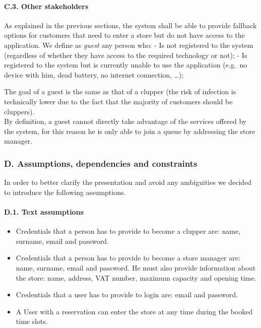 \documentclass[
]{article}
\providecommand{\tightlist}{%
  \setlength{\itemsep}{0pt}\setlength{\parskip}{0pt}}
\begin{document}
\hypertarget{c.3.-other-stakeholders}{%
\paragraph{C.3. Other stakeholders}\label{c.3.-other-stakeholders}}

As explained in the previous sections, the system shall be able to
provide fallback options for customers that need to enter a store but do
not have access to the application. We define as \emph{guest} any person
who: - Is not registered to the system (regardless of whether they have
access to the required technology or not); - Is registered to the system
but is currently unable to use the application (e.g.~no device with him,
dead battery, no internet connection, \ldots);

The goal of a guest is the same as that of a clupper (the risk of
infection is technically lower due to the fact that the majority of
customers should be cluppers).\\
By definition, a guest cannot directly take advantage of the services
offered by the system, for this reason he is only able to join a queue
by addressing the store manager.

\hypertarget{d.-assumptions-dependencies-and-constraints}{%
\subsubsection{D. Assumptions, dependencies and
constraints}\label{d.-assumptions-dependencies-and-constraints}}

In order to better clarify the presentation and avoid any ambiguities we
decided to introduce the following assumptions.

\hypertarget{d.1.-text-assumptions}{%
\paragraph{D.1. Text assumptions}\label{d.1.-text-assumptions}}

\begin{itemize}
\tightlist
\item
  Credentials that a person has to provide to become a clupper are:
  name, surname, email and password.
\item
  Credentials that a person has to provide to become a store manager
  are: name, surname, email and password. He must also provide
  information about the store: name, address, VAT number, maximum
  capacity and opening time.
\item
  Credentials that a user has to provide to login are: email and
  password.
\item
  A User with a reservation can enter the store at any time during the
  booked time slots.
\end{itemize}
\end{document}
